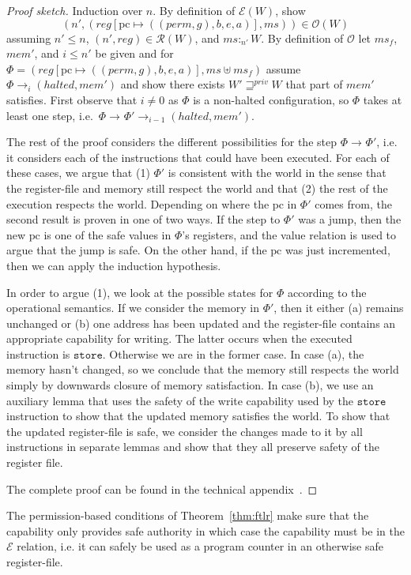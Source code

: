 \documentclass[format=acmsmall, review=true, screen=true]{acmart}
\newcommand{\update}[2]{[#1 \mapsto #2]}
\newcommand{\var}[1]{\mathit{#1}}
\newcommand{\hs}{\var{ms}}
\newcommand{\ms}{\hs}
\newcommand{\gl}{\var{g}}
\newcommand{\pcreg}{\mathrm{pc}}
\newcommand{\addr}{\var{a}}
\newcommand{\start}{\var{b}}
\newcommand{\addrend}{\var{e}}
\newcommand{\mem}{\var{mem}}
\newcommand{\reg}{\var{reg}}
\newcommand{\heap}{\var{mem}}
\newcommand{\perm}{\var{perm}}
\newcommand{\halted}{\mathit{halted}}
\newcommand{\futurestr}{\mathbin{\sqsupseteq}^{\var{priv}}}
\newcommand{\heapSat}[3][\heap]{#1 :_{#2} #3}
\newcommand{\asmType}{\plaindom{AsmType}}
\newcommand{\plaindom}[1]{\mathrm{#1}}
\newcommand{\intr}[2]{\mathcal{#1}}
\newcommand{\exprintr}[1]{\intr{E}{#1}}
\newcommand{\regintr}[1]{\intr{R}{#1}}
\newcommand{\stder}{\exprintr{\asmType}}
\newcommand{\stdrr}{\regintr{\asmType}}
\newcommand{\observations}{\mathcal{O}}
\newcommand{\npair}[2][n]{\left(#1,#2 \right)}
\newcommand{\step}[1][]{\rightarrow_{#1}}
\newenvironment{toplas}%
    {\color{OliveGreen}}{}
\begin{document}
\begin{toplas}
  \begin{proof}[Proof sketch]
    Induction over $n$. By definition of $\stder(W)$, show
    \[
      \npair[n']{(\reg\update{\pcreg}{((\perm,\gl),\start,\addrend,\addr)},\ms)}
      \in \observations(W)
    \]
    assuming $n' \leq n$, $\npair[n']{\reg} \in \stdrr(W)$, and
    $\heapSat[\ms]{n'}{W}$. By definition of $\observations$ let $\ms_f$,
    $\mem'$, and $i \leq n'$ be given and for
    $\Phi = (\reg\update{\pcreg}{((\perm,\gl),\start,\addrend,\addr)},\ms \uplus
    \ms_f)$ assume $\Phi \step[i]
    (\halted,\mem')$ and show there exists $W' \futurestr W$ that part of
    $\mem'$ satisfies. First observe that $i \neq 0$ as $\Phi$ is a non-halted
    configuration, so $\Phi$ takes at least one step, i.e.\ $\Phi \step
    \Phi' \step[i-1] (\halted,\mem')$.

    The rest of the proof considers the different possibilities for the step $\Phi \step
    \Phi'$, i.e. it considers each of the instructions that could have been executed. For
    each of these cases, we argue that (1) $\Phi'$ is consistent with the world
    in the sense that the register-file and memory still respect the world and
    that (2) the rest of the execution respects the world. Depending on where
    the $\pcreg$ in $\Phi'$ comes from, the second result is proven in one of
    two ways. If the step to $\Phi'$ was a jump, then the new $\pcreg$ is one of
    the safe values in $\Phi$'s registers, and the value relation is used to
    argue that the jump is safe. On the other hand, if the $\pcreg$
    was just incremented, then we can apply the induction hypothesis.

    In order to argue (1), we look at the possible states for $\Phi$ according to the operational semantics.
    If we consider the memory in $\Phi'$, then it either (a) remains unchanged or (b) one address has been updated and the register-file contains an appropriate capability for writing.
    The latter occurs when the executed instruction is $\texttt{store}$.
    Otherwise we are in the former case.
    In case (a), the memory hasn't changed, so we conclude that the memory still respects the world simply by downwards closure of memory satisfaction.
    In case (b), we use an auxiliary lemma that uses the safety of the write capability used by the $\texttt{store}$ instruction to show that the updated memory satisfies the world.
    To show that the updated register-file is safe, we consider the changes made to it by all instructions in separate lemmas and show that they all preserve safety of the register file.

    The complete proof can be found in the technical appendix~\citep{technical_appendix}.
  \end{proof}
\end{toplas}
The permission-based conditions of Theorem~\ref{thm:ftlr} make sure that the
capability only provides safe authority in which case the capability must be in
the $\stder$ relation, i.e. it can safely be used as a program counter in an
otherwise safe register-file.
\end{document}
